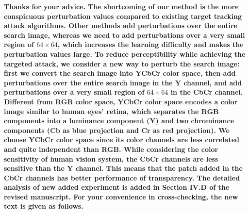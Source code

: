 \documentclass[12pt]{article}
\begin{document}
\textbf{
Thanks for your advice.
The shortcoming of our method is the more conspicuous perturbation values compared to existing target tracking attack algorithms.
Other methods add perturbations over the entire search image, whereas we need to add perturbations over a very small region of $64 \times 64$, which increases the learning difficulty and makes the perturbation values large.
To reduce perceptibility while achieving the targeted attack, we consider a new way to perturb the search image: first we convert the search image into YCbCr color space, then add perturbations over the entire search image in the Y channel, and add perturbations over a very small region of $64 \times 64$ in the CbCr channel.
Different from RGB color space, YCbCr color space encodes a color image similar to human eyes’ retina, which separates the RGB components into a luminance component (Y) and two chrominance components (Cb as blue projection and Cr as red projection).
We choose YCbCr color space since its color channels are less correlated and quite independent than RGB.
While considering the color sensitivity of human vision system, the CbCr channels are less sensitive than the Y channel. This means that the patch added in the CbCr channels has better performance of transparency.
The detailed analysis of new added experiment is added in Section IV.D of the revised manuscript.
For your convenience in cross-checking, the new text is given as follows.}
\end{document}
